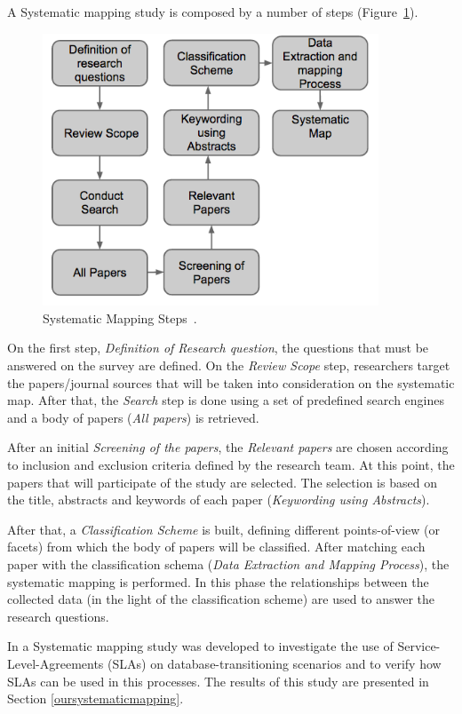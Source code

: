 A Systematic mapping study is composed by a number of steps (Figure~\ref{fig:sms}).
\begin{figure}[ht!]
\centering
\includegraphics[width=100mm]{Imagens/pic1.png}
\caption{Systematic Mapping Steps~\cite{Petersen:2008:SMS:2227115.2227123}.\label{fig:sms}}
\end{figure}

On the first step, \textit{Definition of Research question}, the questions that must be answered on the survey are defined. 
On the \textit{Review Scope} step, researchers target the papers/journal sources that will be taken into consideration on the systematic map. 
After that, the \textit{Search} step is done using a set of predefined search engines and a body of papers (\textit{All papers}) is retrieved. 

After an initial \textit{Screening of the papers}, the \textit{Relevant papers} are chosen according to inclusion and exclusion criteria defined by the research team. 
At this point, the papers that will participate of the study are selected. 
The selection is based on the title, abstracts and keywords of each paper (\textit{Keywording using Abstracts}).

After that, a \textit{Classification Scheme} is built, defining different points-of-view (or facets) from which the body of papers will be classified. 
After matching each paper with the classification schema (\textit{Data Extraction and Mapping Process}), the  systematic mapping is performed.
In this phase the relationships between the collected data (in the light of the classification scheme) are used to answer the research questions.

In \cite{fabioMartinSM} a Systematic mapping study was developed to investigate the use of Service-Level-Agreements (SLAs) on database-transitioning scenarios and to verify how SLAs can be used in this processes. The results of this study are presented in Section \ref{oursystematicmapping}.

